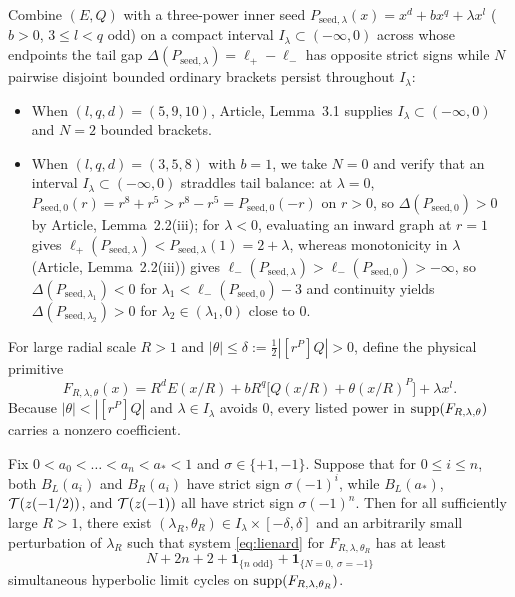 Combine $(E,Q)$ with a three-power inner seed $P_{\mathrm{seed},\lambda}(x)=x^d+bx^q+\lambda x^l$
($b>0$, $3\le l<q$ odd) on a compact interval $I_\lambda\subset(-\infty,0)$ across whose endpoints the
tail gap $\Delta(P_{\mathrm{seed},\lambda})=\ell_+-\ell_-$ has opposite strict signs while $N$
pairwise disjoint bounded ordinary brackets persist throughout $I_\lambda$:
\begin{itemize}
  \item When $(l,q,d)=(5,9,10)$, Article, Lemma~3.1 supplies $I_\lambda\subset(-\infty,0)$ and $N=2$ bounded brackets.
  \item When $(l,q,d)=(3,5,8)$ with $b=1$, we take $N=0$ and verify that an interval
  $I_\lambda\subset(-\infty,0)$ straddles tail balance: at $\lambda=0$,
  $P_{\mathrm{seed},0}(r)=r^8+r^5>r^8-r^5=P_{\mathrm{seed},0}(-r)$ on $r>0$, so
  $\Delta(P_{\mathrm{seed},0})>0$ by Article, Lemma~2.2(iii); for $\lambda<0$, evaluating an
  inward graph at $r=1$ gives
  $\ell_+(P_{\mathrm{seed},\lambda})<P_{\mathrm{seed},\lambda}(1)=2+\lambda$, whereas monotonicity in
  $\lambda$ (Article, Lemma~2.2(iii)) gives
  $\ell_-(P_{\mathrm{seed},\lambda})>\ell_-(P_{\mathrm{seed},0})>-\infty$, so
  $\Delta(P_{\mathrm{seed},\lambda_1})<0$ for $\lambda_1<\ell_-(P_{\mathrm{seed},0})-3$ and continuity
  yields $\Delta(P_{\mathrm{seed},\lambda_2})>0$ for $\lambda_2\in(\lambda_1,0)$ close to $0$.
\end{itemize}
For large radial scale $R>1$ and $|\theta|\le\delta:=\frac{1}{2}|[r^P]Q|>0$, define the physical primitive
\begin{equation}\label{eq:two-field}
  F_{R,\lambda,\theta}(x) = R^d E(x/R) + b R^q\bigl[Q(x/R) + \theta (x/R)^P\bigr] + \lambda x^l.
\end{equation}
Because $|\theta|<|[r^P]Q|$ and $\lambda\in I_\lambda$ avoids $0$, every listed power in
$\operatorname{supp}(F_{R,\lambda,\theta})$ carries a nonzero coefficient.

\begin{proposition}\label{prop:two-marks}
Fix $0<a_0<\dots<a_n<a_*<1$ and $\sigma\in\{+1,-1\}$. Suppose that for $0\le i\le n$, both $B_L(a_i)$
and $B_R(a_i)$ have strict sign $\sigma(-1)^i$, while $B_L(a_*)$, $\mathcal{T}(z(-1/2))$, and $\mathcal{T}(z(-1))$ all
have strict sign $\sigma(-1)^n$. Then for all sufficiently large $R>1$, there exist
$(\lambda_R,\theta_R)\in I_\lambda\times[-\delta,\delta]$ and an arbitrarily small perturbation of
$\lambda_R$ such that system \eqref{eq:lienard} for $F_{R,\lambda,\theta_R}$ has at least
\[
  N + 2n + 2 + \mathbf{1}_{\{n\text{ odd}\}} + \mathbf{1}_{\{N=0,\ \sigma=-1\}}
\]
simultaneous hyperbolic limit cycles on $\operatorname{supp}(F_{R,\lambda,\theta_R})$.
\end{proposition}

